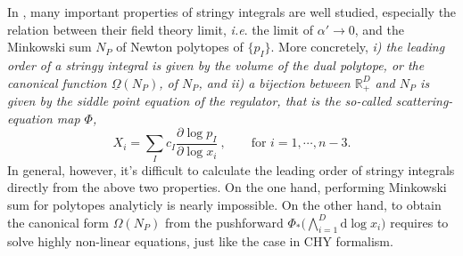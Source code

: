 \documentclass[12pt]{article}
\theoremstyle{definition}
\theoremstyle{plain}
\newcommand{\dif}{\mathrm{d}} %
\begin{document}

In \cite{}, many important properties of stringy integrals are well studied, especially the relation between their field theory limit, {\it{i.e}}. the limit of $\alpha'\to 0$, and the Minkowski sum $N_{P}$ of Newton polytopes of $\{p_I\}$.
More concretely, {\it{ i) the leading order of a stringy integral is given by the volume of the dual polytope, or the canonical function $\underline{\Omega}(N_{P})$, of $N_{P}$, and ii) a bijection between $\mathds{R}_{+}^{D}$ and $N_{P}$ is given by the siddle point equation of the regulator, that is the so-called scattering-equation map $\Phi$,}}
\begin{equation} \label{SEmap}
	X_{i}= \sum_{I}c_{I}\frac{\partial \log p_{I}}{\partial \log x_{i}}\:, \qquad  \text{for }i=1,\cdots,n{-}3.
\end{equation}	
In general, however, it's difficult to calculate the leading order of stringy integrals directly from the above two properties.
On the one hand, performing Minkowski sum for polytopes analyticly is nearly impossible. On the other hand, to obtain the canonical form $\Omega(N_{P})$ from the pushforward $\Phi_{\ast}\bigl(\bigwedge_{i=1}^{D} \dif \log x_{i}\bigr)$ requires to solve highly non-linear equations, just like the case in CHY formalism.
\end{document}
